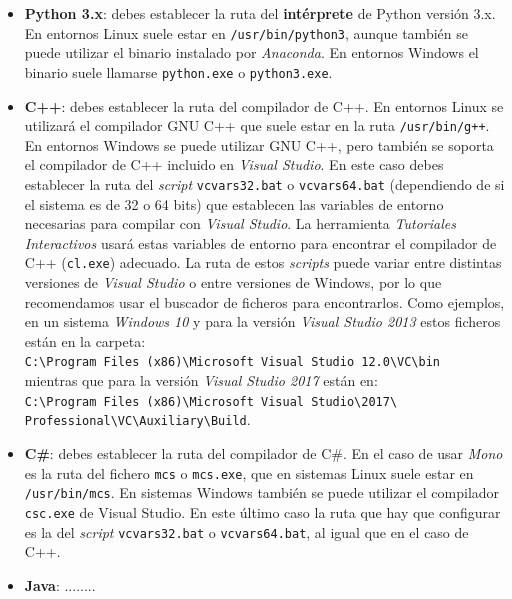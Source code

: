 \documentclass[]{article}
\newcommand{\toolname}{\emph{Tutoriales Interactivos}}
\begin{document}
\begin{itemize}
	\item \textbf{Python 3.x}: debes establecer la ruta del \textbf{intérprete} de Python versión 3.x. En entornos Linux suele estar en \texttt{/usr/bin/python3}, aunque también se puede utilizar el binario instalado por \emph{Anaconda}. En entornos Windows el binario suele llamarse \texttt{python.exe} o \texttt{python3.exe}.
	\item \textbf{C++}: debes establecer la ruta del compilador de C++. En entornos Linux se utilizará el compilador GNU C++ que suele estar en la ruta \texttt{/usr/bin/g++}. En entornos Windows se puede utilizar GNU C++, pero también se soporta el compilador de C++ incluido en \emph{Visual Studio}. En este caso debes establecer la ruta del \emph{script} \texttt{vcvars32.bat} o \texttt{vcvars64.bat} (dependiendo de si el sistema es de 32 o 64 bits) que establecen las variables de entorno necesarias para compilar con \emph{Visual Studio}. La herramienta \toolname{} usará estas variables de entorno para encontrar el compilador de C++ (\texttt{cl.exe}) adecuado. La ruta de estos \emph{scripts} puede variar entre distintas versiones de \emph{Visual Studio} o entre versiones de Windows, por lo que recomendamos usar el buscador de ficheros para encontrarlos. Como ejemplos, en un sistema \emph{Windows 10} y para la versión \emph{Visual Studio 2013} estos ficheros están en la carpeta: \\[0.2cm]
	\texttt{C:\textbackslash Program Files (x86)\textbackslash Microsoft Visual Studio 12.0\textbackslash VC\textbackslash bin}\\[0.2cm]
	mientras que para la versión \emph{Visual Studio 2017} están en:\\[0.2cm]
	\texttt{C:\textbackslash Program Files (x86)\textbackslash Microsoft Visual Studio\textbackslash 2017\textbackslash \\%
		Professional\textbackslash VC\textbackslash Auxiliary\textbackslash Build}.
	\item \textbf{C\#}: debes establecer la ruta del compilador de C\#. En el caso de usar \emph{Mono} es la ruta del fichero \texttt{mcs} o \texttt{mcs.exe}, que en sistemas Linux suele estar en \texttt{/usr/bin/mcs}. En sistemas Windows también se puede utilizar el compilador \texttt{csc.exe} de Visual Studio. En este último caso la ruta que hay que configurar es la del \emph{script} \texttt{vcvars32.bat} o \texttt{vcvars64.bat}, al igual que en el caso de C++.
	\item \textbf{Java}: ........
\end{itemize}
\end{document}
